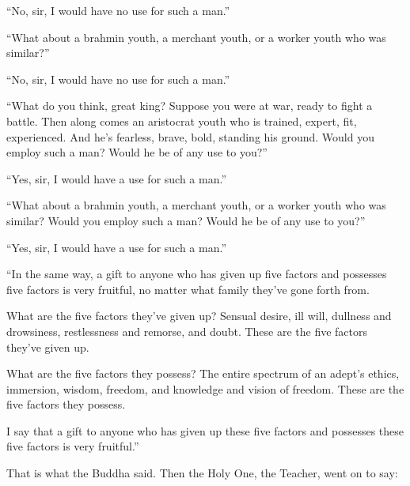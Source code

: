\documentclass[12pt,openany]{book}%
\begin{document}
“No, sir, I would have no use for such a man.” 

“What about a brahmin youth, a merchant youth, or a worker youth who was similar?” 

“No, sir, I would have no use for such a man.” 

“What do you think, great king? Suppose you were at war, ready to fight a battle. Then along comes an aristocrat youth who is trained, expert, fit, experienced. And he’s fearless, brave, bold, standing his ground. Would you employ such a man? Would he be of any use to you?” 

“Yes, sir, I would have a use for such a man.” 

“What about a brahmin youth, a merchant youth, or a worker youth who was similar? Would you employ such a man? Would he be of any use to you?” 

“Yes, sir, I would have a use for such a man.” 

“In the same way, a gift to anyone who has given up five factors and possesses five factors is very fruitful, no matter what family they’ve gone forth from. 

What are the five factors they’ve given up? Sensual desire, ill will, dullness and drowsiness, restlessness and remorse, and doubt. These are the five factors they’ve given up. 

What are the five factors they possess? The entire spectrum of an adept’s ethics, immersion, wisdom, freedom, and knowledge and vision of freedom. These are the five factors they possess. 

I say that a gift to anyone who has given up these five factors and possesses these five factors is very fruitful.” 

That is what the Buddha said. Then the Holy One, the Teacher, went on to say: 
\end{document}
